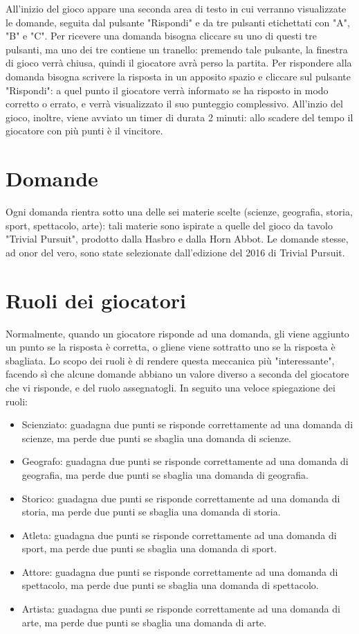 \documentclass[a4paper,12pt]{report}
\begin{document}
All'inizio del gioco appare una seconda area di testo in cui verranno visualizzate le domande, seguita
dal pulsante "Rispondi" e da tre pulsanti etichettati con "A", "B" e "C". Per ricevere una domanda
bisogna cliccare su uno di questi tre pulsanti, ma uno dei tre contiene un tranello: premendo tale
pulsante, la finestra di gioco verrà chiusa, quindi il giocatore avrà perso la partita.
Per rispondere alla domanda bisogna scrivere la risposta in un apposito spazio e cliccare sul pulsante "Rispondi":
a quel punto il giocatore verrà informato se ha risposto in modo corretto o errato, e verrà visualizzato
il suo punteggio complessivo.
All'inzio del gioco, inoltre, viene avviato un timer di durata 2 minuti: allo scadere del tempo il giocatore
con più punti è il vincitore.

\section{Domande}
Ogni domanda rientra sotto una delle sei materie scelte (scienze, geografia, storia, sport, spettacolo, arte):
tali materie sono ispirate a quelle del gioco da tavolo "Trivial Pursuit", prodotto dalla Hasbro e dalla
Horn Abbot. Le domande stesse, ad onor del vero, sono state selezionate dall'edizione del 2016 di Trivial Pursuit.

\section{Ruoli dei giocatori}
Normalmente, quando un giocatore risponde ad una domanda, gli viene aggiunto un punto se la risposta
è corretta, o gliene viene sottratto uno se la risposta è sbagliata. Lo scopo dei ruoli è di rendere
questa meccanica più "interessante", facendo sì che alcune domande abbiano un valore diverso a seconda
del giocatore che vi risponde, e del ruolo assegnatogli. In seguito una veloce spiegazione dei ruoli:
\begin{itemize}
	\item Scienziato: guadagna due punti se risponde correttamente ad una domanda di scienze, ma perde due punti se sbaglia
			una domanda di scienze.
	\item Geografo: guadagna due punti se risponde correttamente ad una domanda di geografia, ma perde due punti se sbaglia
			una domanda di geografia.
	\item Storico: guadagna due punti se risponde correttamente ad una domanda di storia, ma perde due punti se sbaglia
			una domanda di storia.
	\item Atleta: guadagna due punti se risponde correttamente ad una domanda di sport, ma perde due punti se sbaglia
			una domanda di sport.	
	\item Attore: guadagna due punti se risponde correttamente ad una domanda di spettacolo, ma perde due punti se sbaglia
			una domanda di spettacolo.
	\item Artista: guadagna due punti se risponde correttamente ad una domanda di arte, ma perde due punti se sbaglia
			una domanda di arte.
\end{itemize}
\end{document}
